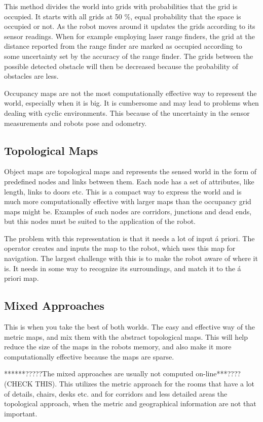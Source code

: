 This method divides the world into grids with probabilities that the grid is occupied. It
starts with all grids at 50 \%, equal probability that the space is occupied or not. As
the robot moves around it updates the grids according to its sensor readings. When for
example employing laser range finders, the grid at the distance reported from the range
finder are marked as occupied according to some uncertainty set by the accuracy of the
range finder. The grids between the possible detected obstacle will then be decreased
because the probability of obstacles are less. 

Occupancy maps are not the most computationally effective way to represent the world,
especially when it is big. It is cumbersome and may lead to problems when dealing with
cyclic environments. This because of the uncertainty in the sensor measurements and robots
pose and odometry. 


\subsection{Topological Maps}
Object maps are topological maps and represents the sensed world in the form of predefined nodes and links
between them. Each node has a set of attributes, like length, links to doors etc. This is
a compact way to express the world and is much more computationally effective with larger
maps than the occupancy grid maps might be. Examples of such nodes are corridors,
junctions and dead ends, but this nodes must be suited to the application of the robot. 

The problem with this representation is that it needs a lot of input \'a priori. The
operator creates and inputs the map to the robot, which uses this map for navigation. The
largest challenge with this is to make the robot aware of where it is. It needs in some
way to recognize its surroundings, and match it to the \'a priori map.


\subsection{Mixed Approaches}
This is when you take the best of both worlds. The easy and effective way of the metric
maps, and mix them with the abstract topological maps. This will help reduce the size of
the maps in the robots memory, and also make it more computationally effective because the
maps are sparse. 

******?????The mixed approaches are usually not computed on-line***???? (CHECK THIS). This utilizes
the metric approach for the rooms that have a lot of details, chairs, desks etc. and for
corridors and less detailed areas the topological approach, when the metric and
geographical information are not that important. 

